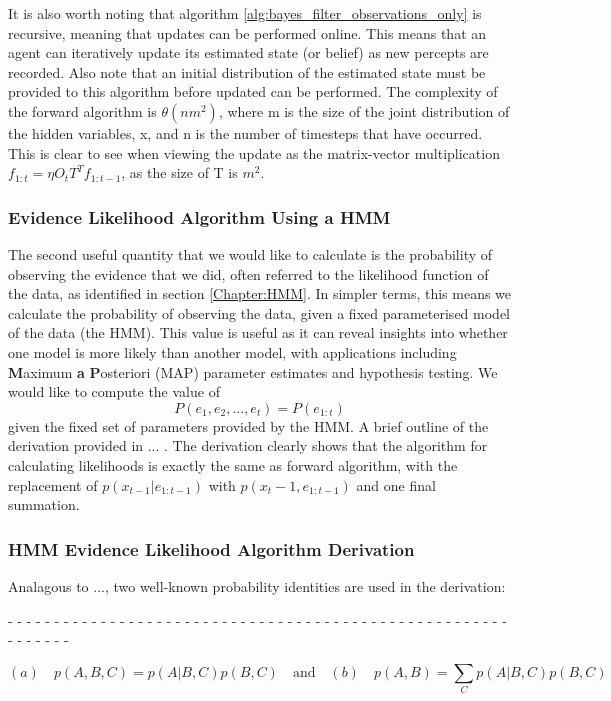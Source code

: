 It is also worth noting that algorithm \ref{alg:bayes_filter_observations_only} is recursive, meaning that updates can be performed online. This means that an agent can iteratively update its estimated state (or belief) as new percepts are recorded. Also note that an initial distribution of the estimated state must be provided to this algorithm before updated can be performed. The complexity of the forward algorithm is $\theta (nm^2)$, where m is the size of the joint distribution of the hidden variables, x, and n is the number of timesteps that have occurred. This is clear to see when viewing the update as the matrix-vector multiplication $f_{1:t} = \eta O_{t} T^{T} f_{1:t-1}$, as the size of T is $m^2$.






\subsubsection{Evidence Likelihood Algorithm Using a HMM}
The second useful quantity that we would like to calculate is the probability of observing the evidence that we did, often referred to the likelihood function of the data, as identified in section \ref{Chapter:HMM}. In simpler terms, this means we calculate the probability of observing the data, given a fixed parameterised model of the data (the HMM). This value is useful as it can reveal insights into whether one model is more likely than another model, with applications including \textbf{M}aximum \textbf{a} \textbf{P}osteriori (MAP) parameter estimates and hypothesis testing. We would like to compute the value of
\[P(e_1, e_2, ..., e_t) = P(e_{1:t})\]
given the fixed set of parameters provided by the HMM. A brief outline of the derivation provided in ... . The derivation clearly shows that the algorithm for calculating likelihoods is exactly the same as forward algorithm, with the replacement of  $p(x_{t-1}|e_{1:t-1})$ with $p(x_t-1, e_{1:t-1})$ and one final summation.


\subsubsection{HMM Evidence Likelihood Algorithm Derivation}\label{section:EvidenceLikelihood}

Analagous to ..., two well-known probability identities are used in the derivation: 
\begin{center}
- - - - - - - - - - - - - - - - - - - - - - - - - - - - - - - - - - - - - - - - - - - - - - - - - - - - - - - - - - - - - 
\end{center}
\[(a) \quad p(A, B, C) = p(A | B, C) p(B, C) \quad \text{and} \quad (b) \quad p(A, B) = \sum_{C}{p(A | B, C)p(B, C)}\]

